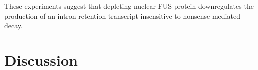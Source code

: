 These experiments suggest that depleting nuclear FUS protein downregulates the production of an intron retention transcript insensitive to nonsense-mediated decay. 







\section{Discussion}

